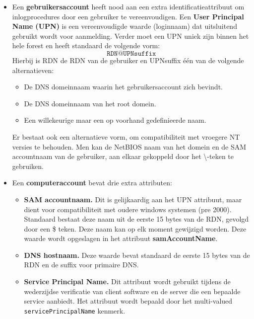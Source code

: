 \documentclass{report}
\begin{document}
\begin{enumerate}
{			\begin{itemize}
				\item Een \textbf{gebruikersaccount} heeft nood aan een extra identificatieattribuut om inlogprocedures door een gebruiker te vereenvoudigen. Een \textbf{User Principal Name (UPN)} is een vereenvoudigde waarde (loginnaam) dat uitsluitend gebruikt wordt voor aanmelding. Verder moet een UPN uniek zijn binnen het hele forest en heeft standaard de volgende vorm:
				$$\texttt{RDN@UPNsuffix}$$
				Hierbij is RDN de RDN van de gebruiker en UPNsuffix één van de volgende alternatieven:
				\begin{itemize}
					\item De DNS domeinnaam waarin het gebruikersaccount zich bevindt.
					\item De DNS domeinnaam van het root domein.
					\item Een willekeurige maar een op voorhand gedefinieerde naam.
				\end{itemize}

				Er bestaat ook een alternatieve vorm, om compatibiliteit met vroegere NT versies te behouden. Men kan de NetBIOS naam van het domein en de SAM accountnaam van de gebruiker, aan elkaar gekoppeld door het \textbackslash-teken te gebruiken.  
				
				\item Een \textbf{computeraccount} bevat drie extra attributen:
				\begin{itemize}
					\item \textbf{SAM accountnaam.} Dit is gelijkaardig aan het UPN attribuut, maar dient voor compatibiliteit met oudere windows systemen (pre 2000). Standaard bestaat deze naam uit de eerste 15 bytes van de RDN, gevolgd door een \$ teken. Deze naam kan op elk moment gewijzigd worden. Deze waarde wordt opgeslagen in het attribuut \textbf{samAccountName}.
					\item \textbf{DNS hostnaam.} Deze waarde bevat standaard de eerste 15 bytes van de RDN en de suffix voor primaire DNS.
					\item \textbf{Service Principal Name.} Dit attribuut wordt gebruikt tijdens de wederzijdse verificatie van client software en de server die een bepaalde service aanbiedt. Het attribuut wordt bepaald door het multi-valued \texttt{servicePrincipalName} kenmerk.
				\end{itemize}
			\end{itemize}
		}
		
		 { 		
			
}
\end{enumerate}
\end{document}
